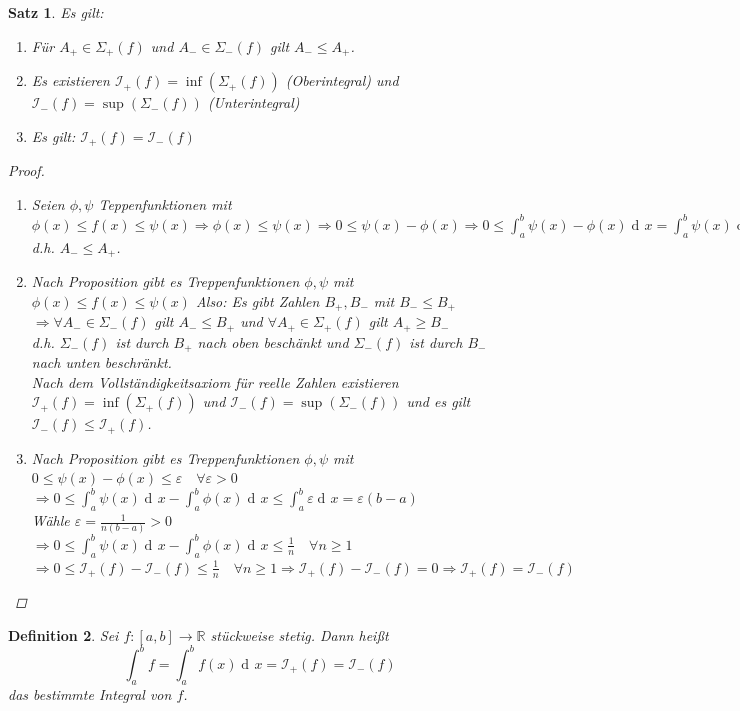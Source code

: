 \documentclass[a4paper,titlepage,oneside]{article}
\def\R{\ensuremath{\mathbb{R}} }
\renewcommand{\epsilon}{\ensuremath{\varepsilon} }
\newcommand{\der}{\operatorname{d\!}{}}
\newcommand{\integral}[4][x]{\ensuremath{\int_{#2}^{#3}{#4\der #1}}}
\newcommand{\intAB}[2][x]{\integral[#1]{a}{b}{#2}}
\newcommand{\OS}[1]{\ensuremath{\Sigma_+\left(#1\right)}}
\newcommand{\US}[1]{\ensuremath{\Sigma_-\left(#1\right)}}
\newcommand{\OI}[1]{\ensuremath{\mathcal{I}_+\left(#1\right)}}
\newcommand{\UI}[1]{\ensuremath{\mathcal{I}_-\left(#1\right)}}
\theoremstyle{thmstyle}
\newtheorem{satz}{Satz}[section]
\newtheorem{defi}[satz]{Definition}
\theoremstyle{subthmstyle}
\begin{document}
\begin{satz}
Es gilt:
\begin{enumerate}
\item Für $A_+ \in \OS{f}$ und $A_- \in \US{f}$ gilt $A_- \le A_+$.
\item Es existieren $\OI{f} = \inf(\OS{f})$ (Oberintegral) und  $\UI{f} = \sup(\US{f})$ (Unterintegral)
\item Es gilt: $\OI{f} = \UI{f}$
\end{enumerate}
\begin{proof}
\begin{enumerate}
\item Seien $\phi, \psi$ Teppenfunktionen mit $ \displaystyle\phi(x) \le f(x) \le \psi(x) \Rightarrow \phi(x) \le \psi(x) \Rightarrow 0 \le \psi(x) - \phi(x) \Rightarrow 0 \le \intAB{\psi(x) - \phi(x)} = \intAB{\psi(x)} - \intAB{\phi(x)}$ d.h. $A_- \le A_+$.
\item Nach Proposition gibt es Treppenfunktionen $\phi, \psi$ mit $\phi(x) \le f(x) \le \psi(x)$ Also: Es gibt Zahlen $B_+, B_-$ mit $B_- \le B_+$\\
$\Rightarrow \forall A_- \in \US{f}$ gilt $ A_- \le B_+$ und $\forall A_+ \in \OS{f}$ gilt $ A_+ \ge B_-$\\
d.h. $\US{f}$ ist durch $B_+$ nach oben beschänkt und $\US{f}$ ist durch $B_-$ nach unten beschränkt.\\
Nach dem Vollständigkeitsaxiom für reelle Zahlen existieren $\OI{f}  = \inf(\OS{f})$ und $\UI{f} = \sup(\US{f})$ und es gilt $\UI{f} \le \OI{f}$.
\item Nach Proposition gibt es Treppenfunktionen $\phi, \psi$ mit $ 0 \le \psi(x) - \phi(x) \le \epsilon \quad \forall \epsilon > 0$\\
$\displaystyle\Rightarrow 0 \le \intAB{\psi(x)} - \intAB{\phi(x)} \le \intAB{\epsilon} = \epsilon(b-a)$\\
Wähle $\displaystyle \epsilon = \frac{1}{n(b-a)} > 0$\\
$\displaystyle\Rightarrow 0 \le \intAB{\psi(x)} - \intAB{\phi(x)} \le \frac{1}{n} \quad \forall n \ge 1$ \\
$\displaystyle\Rightarrow 0 \le \OI{f} - \UI{f} \le \frac{1}{n} \quad \forall n \ge 1 \Rightarrow \OI{f} - \UI{f} = 0 \Rightarrow \OI{f} = \UI{f}$
\end{enumerate}
\end{proof}
\end{satz}

\begin{defi}
Sei $f: [a,b] \to \R$ stückweise stetig. Dann heißt \[\int_{a}^{b}{f} = \intAB{f(x)} = \OI{f} = \UI{f}\] das bestimmte Integral von $f$.
\end{defi}
\end{document}
